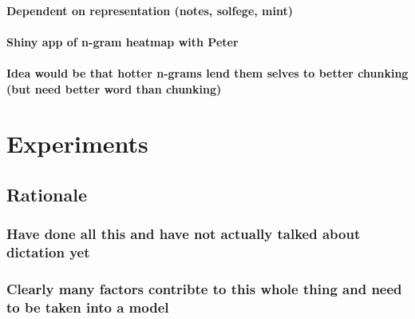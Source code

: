 \documentclass[]{book}
\begin{document}
\hypertarget{dependent-on-representation-notes-solfege-mint}{%
\subsubsection{Dependent on representation (notes, solfege, mint)}\label{dependent-on-representation-notes-solfege-mint}}

\hypertarget{shiny-app-of-n-gram-heatmap-with-peter}{%
\subsubsection{Shiny app of n-gram heatmap with Peter}\label{shiny-app-of-n-gram-heatmap-with-peter}}

\hypertarget{idea-would-be-that-hotter-n-grams-lend-them-selves-to-better-chunking-but-need-better-word-than-chunking}{%
\subsubsection{Idea would be that hotter n-grams lend them selves to better chunking (but need better word than chunking)}\label{idea-would-be-that-hotter-n-grams-lend-them-selves-to-better-chunking-but-need-better-word-than-chunking}}

\hypertarget{experiments}{%
\chapter{Experiments}\label{experiments}}

\hypertarget{rationale-2}{%
\section{Rationale}\label{rationale-2}}

\hypertarget{have-done-all-this-and-have-not-actually-talked-about-dictation-yet}{%
\subsection{Have done all this and have not actually talked about dictation yet}\label{have-done-all-this-and-have-not-actually-talked-about-dictation-yet}}

\hypertarget{clearly-many-factors-contribte-to-this-whole-thing-and-need-to-be-taken-into-a-model}{%
\subsection{Clearly many factors contribte to this whole thing and need to be taken into a model}\label{clearly-many-factors-contribte-to-this-whole-thing-and-need-to-be-taken-into-a-model}}
\end{document}
